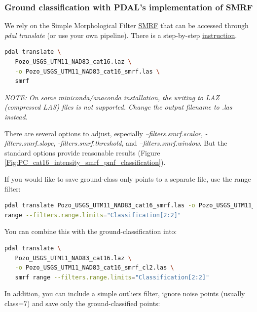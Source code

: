 \documentclass[a4paperpaper,,tablecaptionabove]{scrartcl}
\begin{document}
\hypertarget{ground-classification-with-pdals-implementation-of-smrf}{%
\subsubsection{Ground classification with PDAL's implementation of
SMRF}\label{ground-classification-with-pdals-implementation-of-smrf}}

We rely on the Simple Morphological Filter
\href{https://pdal.io/stages/filters.smrf.html\#filters-smrf}{SMRF} that
can be accessed through \emph{pdal translate} (or use your own
pipeline). There is a step-by-step
\href{https://pdal.io/workshop/exercises/analysis/ground/ground.html}{instruction}.

\begin{lstlisting}[language=bash]
pdal translate \
   Pozo_USGS_UTM11_NAD83_cat16.laz \
   -o Pozo_USGS_UTM11_NAD83_cat16_smrf.las \
   smrf 
\end{lstlisting}

\emph{NOTE: On some miniconda/anaconda installation, the writing to LAZ
(compressed LAS) files is not supported. Change the output filename to
.las instead.}

There are several options to adjust, especially
\emph{--filters.smrf.scalar}, \emph{-filters.smrf.slope},
\emph{-filters.smrf.threshold}, and \emph{--filters.smrf.window}. But
the standard options provide reasonable results (Figure
\ref{Fig:PC_cat16_intensity_smrf_pmf_classification}).

If you would like to save ground-class only points to a separate file,
use the range filter:

\begin{lstlisting}[language=bash]
pdal translate Pozo_USGS_UTM11_NAD83_cat16_smrf.las -o Pozo_USGS_UTM11_NAD83_cat16_smrf_cl2.las
range --filters.range.limits="Classification[2:2]"
\end{lstlisting}

You can combine this with the ground-classification into:

\begin{lstlisting}[language=bash]
pdal translate \
   Pozo_USGS_UTM11_NAD83_cat16.laz \
   -o Pozo_USGS_UTM11_NAD83_cat16_smrf_cl2.las \
   smrf range --filters.range.limits="Classification[2:2]"
\end{lstlisting}

In addition, you can include a simple outliers filter, ignore noise
points (usually class=7) and save only the ground-classified points:
\end{document}
